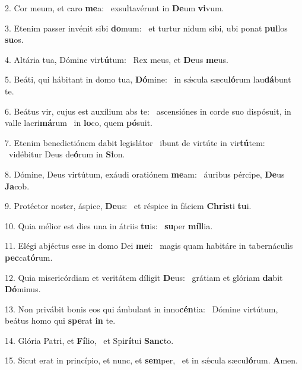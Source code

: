 2. Cor meum, et caro \textbf{me}a: \ast\  exsultavérunt in \textbf{De}um \textbf{vi}vum.\

3. Etenim passer invénit sibi \textbf{do}mum: \ast\  et turtur nidum sibi, ubi ponat \textbf{pul}los \textbf{su}os.\

4. Altária tua, Dómine vir\textbf{tú}tum: \ast\  Rex meus, et \textbf{De}us \textbf{me}us.\

5. Beáti, qui hábitant in domo tua, \textbf{Dó}mine: \ast\  in sǽcula sæcu\textbf{ló}rum lau\textbf{dá}bunt te.\

6. Beátus vir, cujus est auxílium abs te: \dag\  ascensiónes in corde suo dispósuit, in valle lacri\textbf{má}rum \ast\  in \textbf{lo}co, quem \textbf{pó}suit.\

7. Etenim benedictiónem dabit legislátor \dag\  ibunt de virtúte in vir\textbf{tú}tem: \ast\  vidébitur Deus de\textbf{ó}rum in \textbf{Si}on.\

8. Dómine, Deus virtútum, exáudi oratiónem \textbf{me}am: \ast\  áuribus pércipe, \textbf{De}us \textbf{Ja}cob.\

9. Protéctor noster, áspice, \textbf{De}us: \ast\  et réspice in fáciem \textbf{Chris}ti \textbf{tu}i.\

10. Quia mélior est dies una in átriis \textbf{tu}is: \ast\  \textbf{su}per \textbf{míl}lia.\

11. Elégi abjéctus esse in domo Dei \textbf{me}i: \ast\  magis quam habitáre in tabernáculis \textbf{pec}ca\textbf{tó}rum.\

12. Quia misericórdiam et veritátem díligit \textbf{De}us: \ast\  grátiam et glóriam \textbf{da}bit \textbf{Dó}minus.\

13. Non privábit bonis eos qui ámbulant in inno\textbf{cén}tia: \ast\  Dómine virtútum, beátus homo qui \textbf{spe}rat \textbf{in} te.\

14. Glória Patri, et \textbf{Fí}lio, \ast\  et Spi\textbf{rí}tui \textbf{Sanc}to.\

15. Sicut erat in princípio, et nunc, et \textbf{sem}per, \ast\  et in sǽcula sæcu\textbf{ló}rum. \textbf{A}men.\

